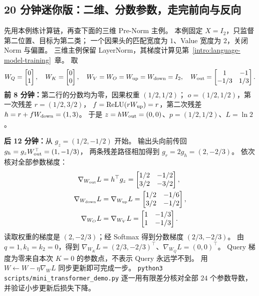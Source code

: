 \subsection{20 分钟迷你版：二维、分数参数，走完前向与反向}
\label{app:rational-mini}
先用本例练计算链，再查下面的三维 Pre-Norm 主例。
本例固定 $X=I_2$，只监督第二位置、目标为第二类；
一个因果头的匹配宽度为 $1$、Value 宽度为 $2$，关闭 Norm 与偏置。
三维主例保留 LayerNorm，其梯度计算见第~\ref*{intro:language-model-training}~章。
取
\[
W_Q=\begin{bmatrix}0\\1\end{bmatrix},\quad W_K=\begin{bmatrix}0\\0\end{bmatrix},\quad
W_V=W_O=W_{\rm up}=W_{\rm down}=I_2,\quad
W_{\rm out}=\begin{bmatrix}1&-1\\-1/3&1/3\end{bmatrix}.
\]
\textbf{前 8 分钟：}第二行的分数均为零，因果权重 $(1/2,1/2)$；
$o=(1/2,1/2)$，第一次残差 $r=(1/2,3/2)$，
$f=\operatorname{ReLU}(rW_{\rm up})=r$，第二次残差 $h=r+fW_{\rm down}=(1,3)$。
于是 $z=hW_{\rm out}=(0,0)$、$p=(1/2,1/2)$、$L=\ln2$。

\textbf{后 12 分钟：}从 $g_z=(1/2,-1/2)$ 开始。
输出头向前传回 $g_h=g_zW_{\rm out}^{\top}=(1,-1/3)$，
两条残差路径相加得到 $g_r=2g_h=(2,-2/3)$。
依次核对全部参数梯度：
\[
\begin{aligned}
\nabla_{W_{\rm out}}L&=h^\top g_z=\begin{bmatrix}1/2&-1/2\\3/2&-3/2\end{bmatrix},\\
\nabla_{W_{\rm down}}L&=\nabla_{W_{\rm up}}L
=\begin{bmatrix}1/2&-1/6\\3/2&-1/2\end{bmatrix},\\
\nabla_{W_O}L&=\nabla_{W_V}L
=\begin{bmatrix}1&-1/3\\1&-1/3\end{bmatrix}.
\end{aligned}
\]
读取权重的梯度是 $(2,-2/3)$；经 Softmax 得到分数梯度 $(2/3,-2/3)$。
由 $q=1,k_1=k_2=0$，得到
$\nabla_{W_K}L=(2/3,-2/3)^\top$、$\nabla_{W_Q}L=(0,0)^\top$。
Query 梯度为零来自本次 $K=0$ 的参数点，不表示 Query 永远学不到。
用 $W\leftarrow W-\eta\nabla_WL$ 同步更新即可完成一步。
\texttt{python3 scripts/mini\_transformer\_demo.py} 逐一用有限差分核对全部 $24$ 个参数导数，并验证小步更新后损失下降。
\medskip

